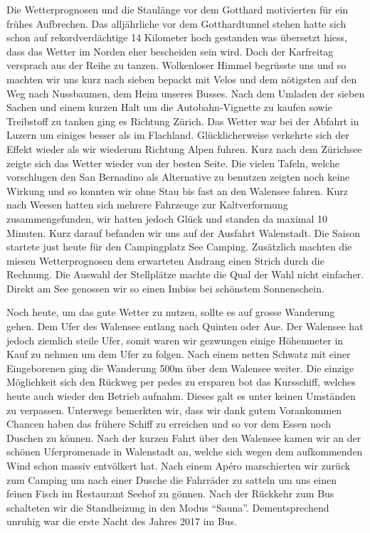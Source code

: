 Die Wetterprognosen und die Staulänge vor dem Gotthard motivierten für ein frühes Aufbrechen.
Das alljährliche vor dem Gotthardtunnel stehen hatte sich schon auf rekordverdächtige 14 Kilometer hoch gestanden was übersetzt hiess, dass das Wetter im Norden eher bescheiden sein wird.
Doch der Karfreitag versprach aus der Reihe zu tanzen.
Wolkenloser Himmel begrüsste uns und so machten wir uns kurz nach sieben bepackt mit Velos und dem nötigsten auf den Weg nach Nussbaumen, dem Heim unseres Busses. 
Nach dem Umladen der sieben Sachen und einem kurzen Halt um die Autobahn-Vignette zu kaufen sowie Treibstoff zu tanken ging es Richtung Zürich.
Das Wetter war bei der Abfahrt in Luzern um einiges besser als im Flachland.
Glücklicherweise verkehrte sich der Effekt wieder als wir wiederum Richtung Alpen fuhren.
Kurz nach dem Zürichsee zeigte sich das Wetter wieder von der besten Seite.
Die vielen Tafeln, welche vorschlugen den San Bernadino als Alternative zu benutzen zeigten noch keine Wirkung
und so konnten wir ohne Stau bis fast an den Walensee fahren.
Kurz nach Weesen hatten sich mehrere Fahrzeuge zur Kaltverformung zusammengefunden, wir hatten jedoch Glück und standen da maximal 10 Minuten.
Kurz darauf befanden wir uns auf der Ausfahrt Walenstadt.
Die Saison startete just heute für den Campingplatz See Camping.
Zusätzlich machten die miesen Wetterprognosen dem erwarteten Andrang einen Strich durch die Rechnung.
Die Auswahl der Stellplätze machte die Qual der Wahl nicht einfacher.
Direkt am See genossen wir so einen Imbiss bei schönstem Sonnenschein.

Noch heute, um das gute Wetter zu nutzen, sollte es auf grosse Wanderung gehen.
Dem Ufer des Walensee entlang nach Quinten oder Aue.
Der Walensee hat jedoch ziemlich steile Ufer, somit waren wir gezwungen einige Höhenmeter in Kauf zu nehmen um dem Ufer zu folgen.
Nach einem netten Schwatz mit einer Eingeborenen ging die Wanderung 500m über dem Walensee weiter.
Die einzige Möglichkeit sich den Rückweg per pedes zu ersparen bot das Kursschiff, welches
heute auch wieder den Betrieb aufnahm.
Dieses galt es unter keinen Umständen zu verpassen.
Unterwegs bemerkten wir, dass wir dank gutem Vorankommen Chancen haben das frühere Schiff zu erreichen und so vor dem Essen noch Duschen zu können.
Nach der kurzen Fahrt über den Walensee kamen wir an der schönen Uferpromenade in  Walenstadt an, welche sich wegen dem aufkommenden Wind schon massiv entvölkert hat.
Nach einem Apéro marschierten wir zurück zum Camping um nach einer Dusche die Fahrräder zu
satteln um uns einen feinen Fisch im Restaurant Seehof zu gönnen.
Nach der Rückkehr zum Bus schalteten wir die Standheizung in den Modus "`Sauna"'.
Dementsprechend unruhig war die erste Nacht des Jahres 2017 im Bus.


